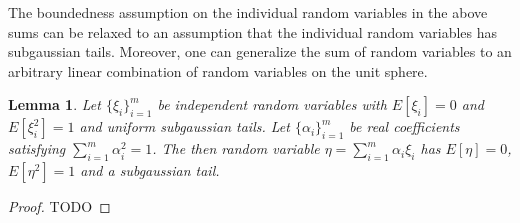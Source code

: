 \documentclass{amsart}
\newtheorem{lem}[thm]{Lemma}
\theoremstyle{remark}
\theoremstyle{definition}
\begin{document}
 The boundedness assumption on the individual random variables in the
above sums can be relaxed to an assumption that the individual random
variables has subgaussian tails.  Moreover, one can generalize the sum
of random variables to an arbitrary linear combination of random
variables on the unit sphere.

\begin{lem}\label{Matousek} Let $\{\xi_i\}_{i=1}^m$ be independent
  random variables with $E[\xi_i]=0$ and $E[\xi_i^2]=1$ and uniform
  subgaussian tails.  Let $\{\alpha_i\}_{i=1}^m$ be real coefficients
satisfying $\sum_{i=1}^m \alpha_i^2 = 1$.  The then random variable
$\eta=\sum_{i=1}^m \alpha_i\xi_i$ has $E[\eta]=0$, $E[\eta^2]=1$ and a
subgaussian tail.
\end{lem}
\begin{proof}
TODO
\end{proof}
\end{document}
